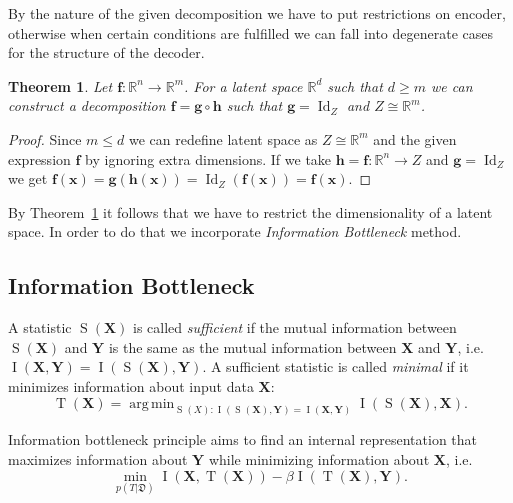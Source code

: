 \documentclass{article}
\newtheorem{theorem}{Theorem}[section]
\DeclareMathOperator*{\argmin}{arg\,min}
\begin{document}
    By the nature of the given decomposition we have to put restrictions on encoder, otherwise when certain conditions are fulfilled we can fall into degenerate cases for the structure of the decoder.
    \begin{theorem}\label{bottleneck_dim}
        Let \(\mathbf{f}:\mathbb{R}^n \rightarrow \mathbb{R}^m\). For a latent space \(\mathbb{R}^d\) such that \(d \ge m\) we can construct a decomposition \(\mathbf{f} = \mathbf{g} \circ \mathbf{h}\) such that \(\mathbf{g} = \operatorname{Id}_Z\) and \(Z \cong \mathbb{R}^m\).
    \end{theorem}
    \begin{proof}
        Since \(m \le d\) we can redefine latent space as \(Z \cong \mathbb{R}^m\) and the given expression \(\mathbf{f}\) by ignoring extra dimensions. If we take \(\mathbf{h} = \mathbf{f} : \mathbb{R}^n \rightarrow Z\) and \(\mathbf{g} = \operatorname{Id}_{Z}\) we get \(\mathbf{f}(\mathbf{x}) = \mathbf{g}(\mathbf{h}(\mathbf{x})) = \operatorname{Id}_{Z} (\mathbf{f}(\mathbf{x})) = \mathbf{f}(\mathbf{x})\).
    \end{proof}

    By Theorem~\ref{bottleneck_dim} it follows that we have to restrict the dimensionality of a latent space. In order to do that we incorporate \textit{Information Bottleneck} method.
    
    \subsection{Information Bottleneck}        
        A statistic \(\operatorname{S}(\mathbf{X})\) is called \textit{sufficient} if the mutual information between \(\operatorname{S}(\mathbf{X})\) and \(\mathbf{Y}\) is the same as the mutual information between \(\mathbf{X}\) and \(\mathbf{Y}\), i.e. \(\operatorname{I}(\mathbf{X}, \mathbf{Y}) = \operatorname{I}(\operatorname{S}(\mathbf{X}), \mathbf{Y})\). A sufficient statistic is called \textit{minimal} if it minimizes information about input data \(\mathbf{X}\):
        \[
            \operatorname{T}(\mathbf{X}) = \argmin_{\operatorname{S}(X): \operatorname{I}(\operatorname{S}(\mathbf{X}), \mathbf{Y}) = \operatorname{I}(\mathbf{X}, \mathbf{Y})} \operatorname{I}(\operatorname{S}(\mathbf{X}), \mathbf{X}).
        \]
        
        Information bottleneck principle aims to find an internal representation that maximizes information about \(\mathbf{Y}\) while minimizing information about \(\mathbf{X}\), i.e.
        \[
            \min_{p(T | \mathfrak{D})} \operatorname{I}(\mathbf{X}, \operatorname{T}(\mathbf{X})) - \beta \operatorname{I}(\operatorname{T}(\mathbf{X}), \mathbf{Y}).
        \]
            
\end{document}
